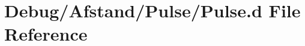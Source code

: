 \hypertarget{_pulse_8d}{}\section{Debug/\+Afstand/\+Pulse/\+Pulse.d File Reference}
\label{_pulse_8d}
